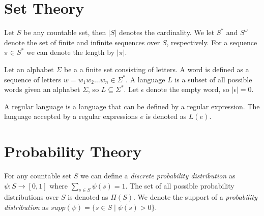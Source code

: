 \section*{Set Theory}
Let $S$ be any countable set, then $|S|$ denotes the cardinality. We let $S^*$ and $S^\omega$ denote the set of finite and infinite sequences over $S$, respectively. For a sequence $\pi\in S^*$ we can denote the length by $|\pi|$.

Let an alphabet $\Sigma$ be a a finite set consisting of letters. A word is defined as a sequence of letters $w=w_1 w_2\dots w_n\in \Sigma^*$. A language $L$ is a subset of all possible words given an alphabet $\Sigma$, so $L\subseteq \Sigma^*$. Let $\epsilon$ denote the empty word, so $|\epsilon|=0$.

A regular language is a language that can be defined by a regular expression. The language accepted by a regular expressions $e$ is denoted as $L(e)$.



\section*{Probability Theory}
For any countable set $S$ we can define a \textit{discrete probability distribution} as $\psi: S\to[0,1]$ where $\sum\limits_{s\in S} \psi(s)=1$. The set of all possible probability distributions over $S$ is denoted as $\Pi(S)$. We denote the support of a \textit{probability distribution} as $supp(\psi)=\{s\in S\mid \psi(s)>0\}$.\\


	



